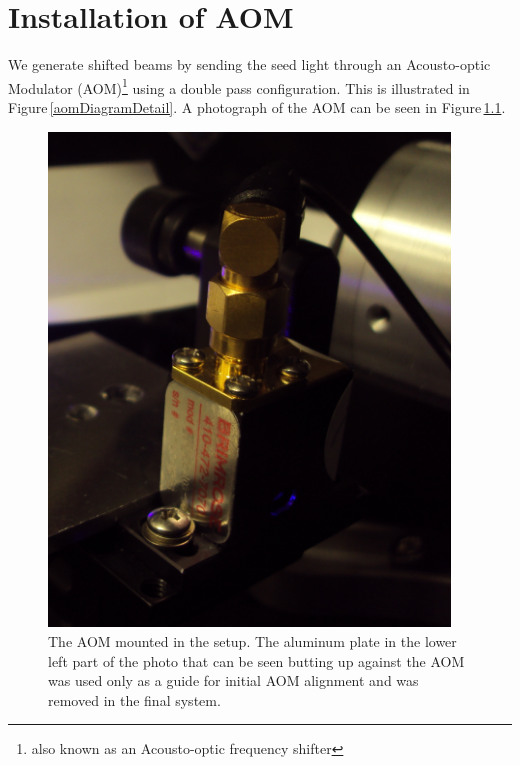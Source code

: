 \chapter{Installation of AOM}\label{AOMInstallChapter}

We generate shifted beams by sending the seed light through an Acousto-optic Modulator (AOM)\footnote{also known as an Acousto-optic frequency shifter} using a double pass configuration. This is illustrated in Figure\,\ref{aomDiagramDetail}. A photograph of the AOM can be seen in Figure\,\ref{aom_upclose}.

\begin{figure}
\centerline{
\includegraphics[width=0.95\textwidth]{aom_upclose.JPG}}
\caption[Photograph of AOM]{\label{aom_upclose} The AOM mounted in the setup. The aluminum plate in the lower left part of the photo that can be seen butting up against the AOM was used only as a guide for initial AOM alignment and was removed in the final system.}
\end{figure}
